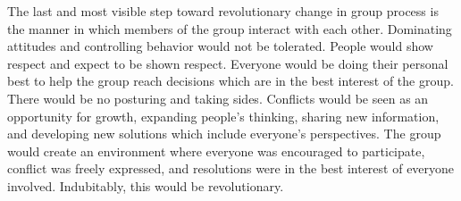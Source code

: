 The last and most visible step toward revolutionary change in
group process is the manner in which members of the group interact
with each other.  Dominating attitudes and controlling behavior
would not be tolerated.  People would show respect and expect to
be shown respect.  Everyone would be doing their personal best to
help the group reach decisions which are in the best interest of
the group.  There would be no posturing and taking sides.
Conflicts would be seen as an opportunity for growth, expanding
people's thinking, sharing new information, and developing new
solutions which include everyone's perspectives.  The group would
create an environment where everyone was encouraged to
participate, conflict was freely expressed, and resolutions were
in the best interest of everyone involved.  Indubitably, this
would be revolutionary.
